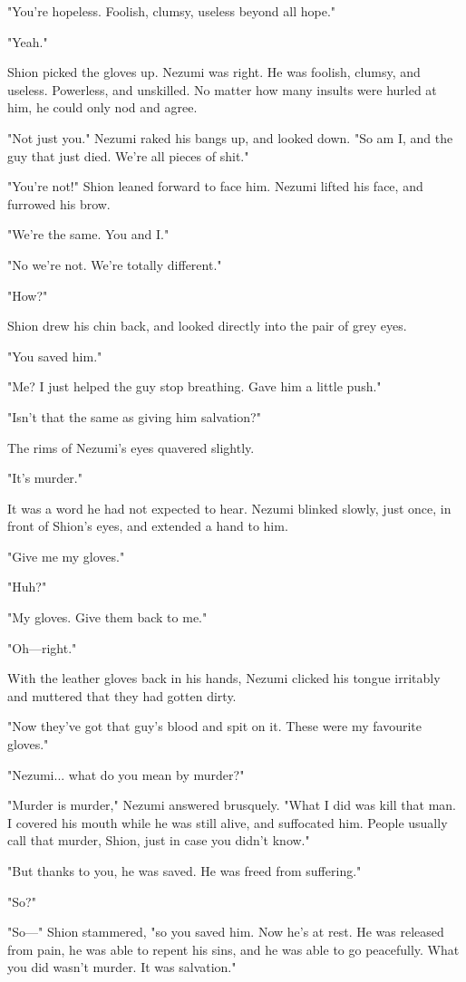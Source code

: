 "You're hopeless. Foolish, clumsy, useless beyond all hope."

"Yeah."

Shion picked the gloves up. Nezumi was right. He was foolish, clumsy,
and useless. Powerless, and unskilled. No matter how many insults were
hurled at him, he could only nod and agree.

"Not just you." Nezumi raked his bangs up, and looked down. "So am I,
and the guy that just died. We're all pieces of shit."

"You're not!" Shion leaned forward to face him. Nezumi lifted his face,
and furrowed his brow.

"We're the same. You and I."

"No we're not. We're totally different."

"How?"

Shion drew his chin back, and looked directly into the pair of grey
eyes.

"You saved him."

"Me? I just helped the guy stop breathing. Gave him a little push."

"Isn't that the same as giving him salvation?"

The rims of Nezumi's eyes quavered slightly.

"It's murder."

It was a word he had not expected to hear. Nezumi blinked slowly, just
once, in front of Shion's eyes, and extended a hand to him.

"Give me my gloves."

"Huh?"

"My gloves. Give them back to me."

"Oh---right."

With the leather gloves back in his hands, Nezumi clicked his tongue
irritably and muttered that they had gotten dirty.

"Now they've got that guy's blood and spit on it. These were my
favourite gloves."

"Nezumi... what do you mean by murder?"

"Murder is murder," Nezumi answered brusquely. "What I did was kill that
man. I covered his mouth while he was still alive, and suffocated him.
People usually call that murder, Shion, just in case you didn't know."

"But thanks to you, he was saved. He was freed from suffering."

"So?"

"So---" Shion stammered, "so you saved him. Now he's at rest. He was
released from pain, he was able to repent his sins, and he was able to
go peacefully. What you did wasn't murder. It was salvation."

